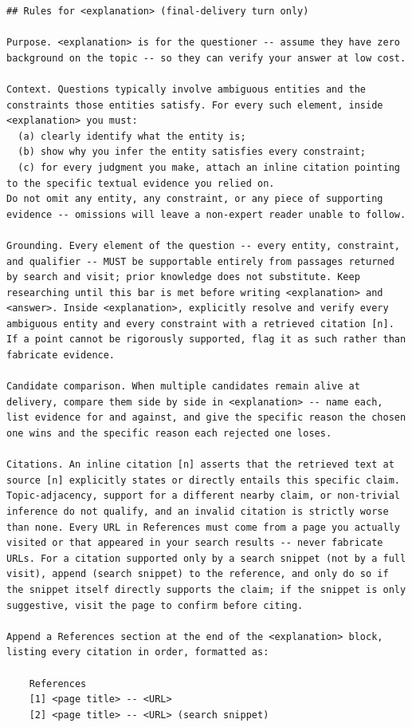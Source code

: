 \documentclass{llmxive}
\begin{document}
\begin{lstlisting}
## Rules for <explanation> (final-delivery turn only)

Purpose. <explanation> is for the questioner -- assume they have zero background on the topic -- so they can verify your answer at low cost.

Context. Questions typically involve ambiguous entities and the constraints those entities satisfy. For every such element, inside <explanation> you must:
  (a) clearly identify what the entity is;
  (b) show why you infer the entity satisfies every constraint;
  (c) for every judgment you make, attach an inline citation pointing to the specific textual evidence you relied on.
Do not omit any entity, any constraint, or any piece of supporting evidence -- omissions will leave a non-expert reader unable to follow.

Grounding. Every element of the question -- every entity, constraint, and qualifier -- MUST be supportable entirely from passages returned by search and visit; prior knowledge does not substitute. Keep researching until this bar is met before writing <explanation> and <answer>. Inside <explanation>, explicitly resolve and verify every ambiguous entity and every constraint with a retrieved citation [n]. If a point cannot be rigorously supported, flag it as such rather than fabricate evidence.

Candidate comparison. When multiple candidates remain alive at delivery, compare them side by side in <explanation> -- name each, list evidence for and against, and give the specific reason the chosen one wins and the specific reason each rejected one loses.

Citations. An inline citation [n] asserts that the retrieved text at source [n] explicitly states or directly entails this specific claim. Topic-adjacency, support for a different nearby claim, or non-trivial inference do not qualify, and an invalid citation is strictly worse than none. Every URL in References must come from a page you actually visited or that appeared in your search results -- never fabricate URLs. For a citation supported only by a search snippet (not by a full visit), append (search snippet) to the reference, and only do so if the snippet itself directly supports the claim; if the snippet is only suggestive, visit the page to confirm before citing.

Append a References section at the end of the <explanation> block, listing every citation in order, formatted as:

    References
    [1] <page title> -- <URL>
    [2] <page title> -- <URL> (search snippet)


\end{lstlisting}
\end{document}
